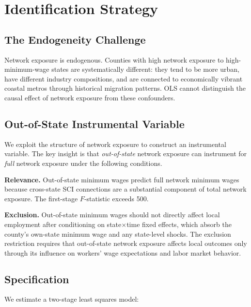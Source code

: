 \documentclass[12pt]{article}
\begin{document}
\section{Identification Strategy}
\label{sec:identification}

\subsection{The Endogeneity Challenge}

Network exposure is endogenous. Counties with high network exposure to high-minimum-wage states are systematically different: they tend to be more urban, have different industry compositions, and are connected to economically vibrant coastal metros through historical migration patterns. OLS cannot distinguish the causal effect of network exposure from these confounders.

\subsection{Out-of-State Instrumental Variable}

We exploit the structure of network exposure to construct an instrumental variable. The key insight is that \textit{out-of-state} network exposure can instrument for \textit{full} network exposure under the following conditions.

\textbf{Relevance.} Out-of-state minimum wages predict full network minimum wages because cross-state SCI connections are a substantial component of total network exposure. The first-stage $F$-statistic exceeds 500.

\textbf{Exclusion.} Out-of-state minimum wages should not directly affect local employment after conditioning on state$\times$time fixed effects, which absorb the county's own-state minimum wage and any state-level shocks. The exclusion restriction requires that out-of-state network exposure affects local outcomes only through its influence on workers' wage expectations and labor market behavior.

\subsection{Specification}

We estimate a two-stage least squares model:
\end{document}
